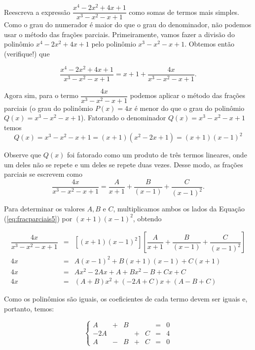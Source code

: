 \begin{exem}
    Reescreva a expressão $\dfrac{x^4 - 2x^2 + 4x + 1}{x^3 - x^2 - x + 1}$ como somas de termos mais simples. \\[10pt]

    Como o grau do numerador é maior do que o grau do denominador, não podemos usar o método das frações parciais. Primeiramente, vamos fazer a divisão do polinômio $x^4 - 2x^2 + 4x + 1$ pelo polinômio $x^3 - x^2 - x + 1$. Obtemos então (verifique!) que 

    $$\dfrac{x^4 - 2x^2 + 4x + 1}{x^3 - x^2 - x + 1} = x + 1 + \dfrac{4x}{x^3 - x^2 - x + 1}.$$

    Agora sim, para o termo $\dfrac{4x}{x^3 - x^2 - x + 1}$ podemos aplicar o método das frações parciais (o grau do polinômio $P(x) = 4x$ é menor do que o grau do polinômio $Q(x) = x^3 - x^2 - x + 1$). Fatorando o denominador $Q(x) = x^3 - x^2 - x + 1$ temos $$Q(x) = x^3 - x^2 - x + 1 = (x+1)(x^2 - 2x +1) = (x+1)(x - 1)^2$$

    Observe que $Q(x)$ foi fatorado como um produto de três termos lineares, onde um deles não se repete e um deles se repete duas vezes. Desse modo, as frações parciais se escrevem como 
    \begin{equation}
    \label{eq:fracparciais5}
    \dfrac{4x}{x^3 - x^2 - x + 1} = \dfrac{A}{x+1} + \dfrac{B}{(x-1)} + \dfrac{C}{(x-1)^2}.
    \end{equation}

    Para determinar os valores $A, B$ e $C$, multiplicamos ambos os lados da Equação (\ref{eq:fracparciais5}) por $(x+1)(x-1)^2$, obtendo

    \begin{eqnarray*}
    [(x+1)(x-1)^2]\dfrac{4x}{x^3 - x^2 - x + 1} & = & [(x+1)(x-1)^2] \left[\dfrac{A}{x+1} + \dfrac{B}{(x-1)} + \dfrac{C}{(x-1)^2}\right]\\[5pt]
    4x & =& A(x-1)^2 + B(x+1)(x-1) + C(x+1) \\[5pt]
    4x & =& Ax^2 - 2Ax + A + Bx^2 - B + Cx + C\\[5pt]
    4x & = & (A+B)x^2 + (-2A + C)x + (A - B + C)
    \end{eqnarray*}

    Como os polinômios são iguais, os coeficientes de cada termo devem ser iguais e, portanto, temos:

    \begin{equation*}
    \left\{ \begin{array}{ccccccc} 
    A & + & B &  &  &=& 0 \\[5pt]
    -2A &  &  &  + & C &=& 4\\[5pt]
    A & - & B & + & C &=& 0
    \end{array}
    \right.    
    \end{equation*}


\end{exem}
